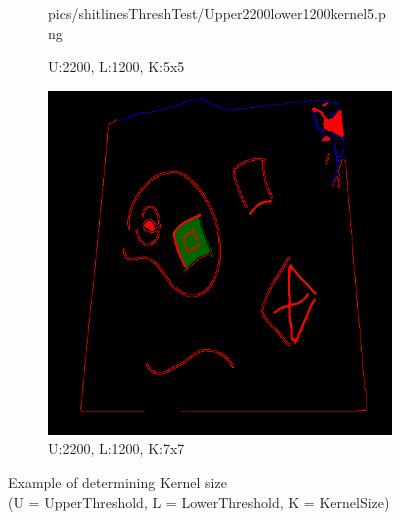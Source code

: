 \documentclass[11pt]{article}
\begin{document}
\begin{figure}[H]
\begin{subfigure}[t]{.25\textwidth}
		{pics/shitlinesThreshTest/Upper2200lower1200kernel5.png}
		\caption{U:2200, L:1200, K:5x5}
	\end{subfigure}
\hfill
	\begin{subfigure}[t]{.25\textwidth}
		\centering
		\includegraphics[scale=0.3]
		{pics/shitlinesThreshTest/Upper2200lower1200kernel7.png}
		\caption{U:2200, L:1200, K:7x7}
	\end{subfigure}
	
	\caption{Example of determining Kernel size \\
		(U = UpperThreshold, L = LowerThreshold, K = KernelSize)}
	\label{fig:kernelDetermining}
\end{figure}
\end{document}
